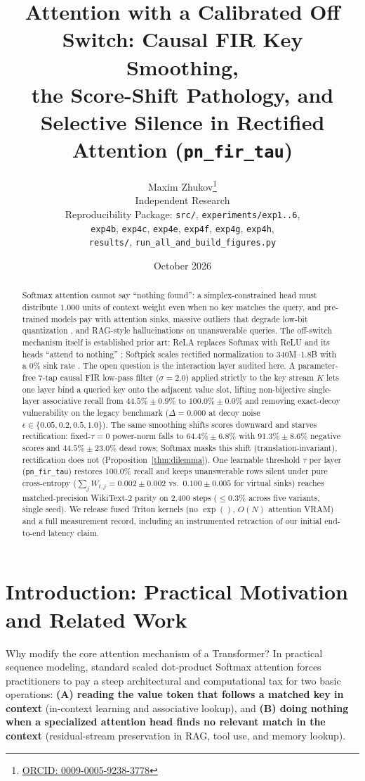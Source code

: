 \documentclass[11pt,a4paper]{article}
\title{\textbf{Attention with a Calibrated Off Switch: Causal FIR Key Smoothing,\\ the Score-Shift Pathology, and Selective Silence in Rectified Attention (\texttt{pn\_fir\_tau})}}
\author{Maxim Zhukov\footnote{\href{https://orcid.org/0009-0005-9238-3778}{ORCID: 0009-0005-9238-3778}} \\ Independent Research \\ \small Reproducibility Package: \texttt{src/}, \texttt{experiments/exp1..6}, \\ \texttt{exp4b}, \texttt{exp4c}, \texttt{exp4e}, \texttt{exp4f}, \texttt{exp4g}, \texttt{exp4h}, \\ \texttt{results/}, \texttt{run\_all\_and\_build\_figures.py}}
\date{October 2026}
\begin{document}
\maketitle

\begin{abstract}
Softmax attention cannot say ``nothing found'': a simplex-constrained head must distribute $1.000$ units of context weight even when no key matches the query, and pre-trained models pay with attention sinks, massive outliers that degrade low-bit quantization \cite{bondarenko2023quantizable,zuhri2025softpick,sun2024massive}, and RAG-style hallucinations on unanswerable queries. The off-switch mechanism itself is established prior art: ReLA replaces Softmax with ReLU and its heads ``attend to nothing'' \cite{zhang2021rela}; Softpick scales rectified normalization to 340M--1.8B with a 0\% sink rate \cite{zuhri2025softpick}. The open question is the interaction layer audited here. A parameter-free 7-tap causal FIR low-pass filter ($\sigma=2.0$) applied strictly to the key stream $K$ lets one layer bind a queried key onto the adjacent value slot, lifting non-bijective single-layer associative recall from $44.5\% \pm 0.9\%$ to $100.0\% \pm 0.0\%$ and removing exact-decoy vulnerability on the legacy benchmark ($\Delta = 0.000$ at decoy noise $\epsilon \in \{0.05, 0.2, 0.5, 1.0\}$). The same smoothing shifts scores downward and starves rectification: fixed-$\tau{=}0$ power-norm falls to $64.4\% \pm 6.8\%$ with $91.3\% \pm 8.6\%$ negative scores and $44.5\% \pm 23.0\%$ dead rows; Softmax masks this shift (translation-invariant), rectification does not (Proposition~\ref{thm:dilemma}). One learnable threshold $\tau$ per layer (\texttt{pn\_fir\_tau}) restores $100.0\%$ recall and keeps unanswerable rows silent under pure cross-entropy ($\sum_{j} W_{t,j} = 0.002 \pm 0.002$ vs.\ $0.100 \pm 0.005$ for virtual sinks) reaches matched-precision WikiText-2 parity on 2,400 steps ($\le 0.3\%$ across five variants, single seed). We release fused Triton kernels (no $\exp()$, $O(N)$ attention VRAM) and a full measurement record, including an instrumented retraction of our initial end-to-end latency claim.


\end{abstract}

\section{Introduction: Practical Motivation and Related Work}

Why modify the core attention mechanism of a Transformer? In practical sequence modeling, standard scaled dot-product Softmax attention \cite{vaswani2017attention} forces practitioners to pay a steep architectural and computational tax for two basic operations: \textbf{(A) reading the value token that follows a matched key in context} (in-context learning and associative lookup), and \textbf{(B) doing nothing when a specialized attention head finds no relevant match in the context} (residual-stream preservation in RAG, tool use, and memory lookup).
\end{document}
